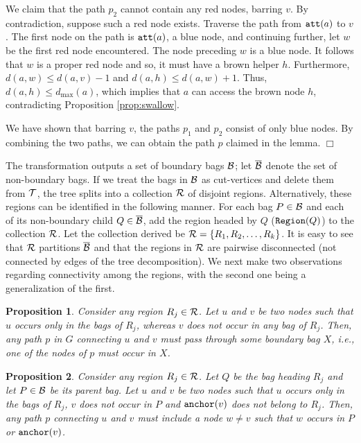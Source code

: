 \documentclass[11pt]{article}
\newtheorem{proposition}{Proposition}[section]
\newcommand{\att} {{\tt att}}
\newcommand{\anc} {{\tt anchor}}
\newcommand{\dmax} {d_{\max}}
\newcommand{\myreg} {{\tt Region}}
\newcommand{\calT} {{\cal T}}
\newcommand{\calB} {{\cal B}}
\newcommand{\calR} {{\cal R}}
\newcommand{\calBbar} {\overline{\cal B}}
\newcommand{\qed} {\hfill$\Box$}
\begin{document}
We claim that the path $p_2$ cannot contain any red nodes, barring $v$.
By contradiction, suppose such a red node exists.
Traverse the path from $\att(a)$ to $v$.  The first node on the path is $\att(a)$, a blue node,
and continuing further, let $w$ be the first red node encountered. 
The node preceding $w$ is a blue node.
It follows that $w$ is a proper red node and so, it must have a brown helper $h$.
Furthermore, $d(a, w) \leq d(a, v)-1$ and $d(a, h) \leq d(a, w)+1$.
Thus, $d(a, h) \leq \dmax(a)$, which implies that $a$ can access the brown node $h$, contradicting Proposition \ref{prop:swallow}.

We have shown that barring $v$, the paths $p_1$ and $p_2$ consist of only blue nodes.
By combining the two paths, we can obtain  the path $p$ claimed in the lemma.
\qed

The transformation outputs a set of boundary bags $\calB$; let $\calBbar$ denote the set of non-boundary bags.
If we treat the bags in $\calB$ as cut-vertices and delete them from $\calT$,
the tree splits into a collection $\calR$ of disjoint regions.
Alternatively, these regions can be identified in the following manner.
For each bag $P\in \calB$ and each of its non-boundary child $Q\in \calBbar$,
add the region headed by $Q$ ($\myreg(Q)$) to the collection $\calR$.
Let the collection derived be $\calR=\{R_1, R_2, \ldots, R_k\}$.
It is easy to see that $\calR$ partitions $\calBbar$ and that the regions in $\calR$ are pairwise disconnected 
(not connected by edges of the tree decomposition).
We next make two observations regarding connectivity among the regions, with the second one being a generalization of the first.

\begin{proposition}
\label{prop:reg-reg1}
Consider any region $R_j\in \calR$. Let $u$ and $v$ be two nodes such that $u$ occurs only in the bags of $R_j$,
whereas $v$ does not occur in any bag of $R_j$.
Then, any path $p$ in $G$ connecting $u$ and $v$ must pass through some boundary bag $X$,
i.e., one of the nodes of $p$ must occur in $X$.
\end{proposition}

\begin{proposition}
\label{prop:reg-reg2}
Consider any region $R_j\in \calR$. Let $Q$ be the bag heading $R_j$ and let $P\in \calB$ be its parent bag.
Let $u$ and $v$ be two nodes such that $u$ occurs only in the bags of $R_j$,
$v$ does not occur in $P$ and  $\anc(v)$ does not belong to $R_j$.
Then, any path $p$ connecting $u$ and $v$ must
include a node $w\neq v$ such that $w$ occurs in $P$ or $\anc(v)$. 
\end{proposition}
\end{document}
